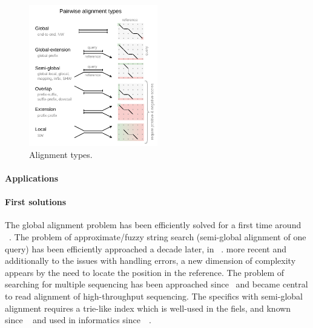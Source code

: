 

\begin{figure}[t]
    \includegraphics[width=0.5\textwidth]{alignment-types}
	\caption[Alignment types]{Alignment types.}
    \label{fig:alignment-types}
\end{figure}

\paragraph{Applications}

\paragraph{First solutions} The global alignment problem has been efficiently
solved for a first time around
\citeyear{vintsyuk1968speech}~\cite{vintsyuk1968speech,needleman1970general}.
The problem of approximate/fuzzy string search (semi-global alignment of one
query) has been efficiently approached a decade later, in
\citeyear{sellers1980theory}~\cite{sellers1980theory,smith1981identification}.
more recent and additionally to the issues with handling errors, a new dimension
of complexity appears by the need to locate the position in the reference. The
problem of searching for multiple sequencing has been approached
since\citeyear{pearson1988improved}~\cite{pearson1988improved} and became
central to read alignment of high-throughput sequencing. The specifics with
semi-global alignment requires a trie-like index which is well-used in the
fiels, and known since
\citeyear{thue1912gegenseitige}~\cite{thue1912gegenseitige} and used in
informatics since~\citeyear{de1959file}~\cite{de1959file}.

